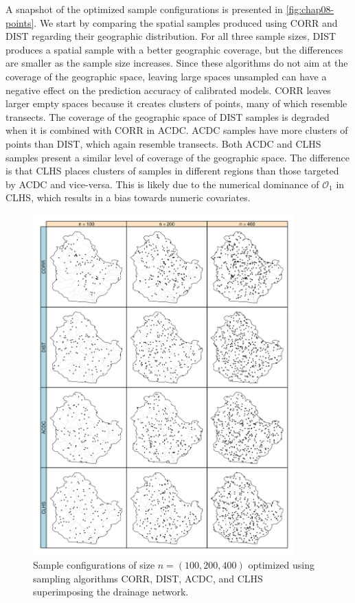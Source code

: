 A snapshot of the optimized sample configurations is presented in \autoref{fig:chap08-points}. We start by 
comparing the spatial samples produced using CORR and DIST regarding their geographic distribution. For all 
three sample sizes, DIST produces a spatial sample with a better geographic coverage, but the differences are 
smaller as the sample size increases. Since these algorithms do not aim at the coverage of the geographic 
space, leaving large spaces unsampled can have a negative effect on the prediction accuracy of calibrated 
models. CORR leaves larger empty spaces because it creates clusters of points, many of which resemble 
transects. The coverage of the geographic space of DIST samples is degraded when it is combined with CORR in 
ACDC. 
ACDC samples have more clusters of points than DIST, which again resemble transects. Both ACDC and CLHS samples 
present a similar level of coverage of the geographic space. The difference is that CLHS places clusters of 
samples in different regions than those targeted by ACDC and vice-versa. This is likely due to the numerical 
dominance of $\mathcal{O}_1$ in CLHS, which results in a bias towards numeric covariates.

\begin{figure}[!ht]
 \centering
 \includegraphics[width=0.90\textwidth]{fig/chap08-points-corr-dist-acdc-clhs}
 \caption[Sample configurations optimized using four sampling algorithms.]{Sample configurations of size 
 $n = (100, 200, 400)$ optimized using sampling algorithms CORR, DIST,  ACDC, and CLHS superimposing the
 drainage network.}
 \label{fig:chap08-points}
\end{figure}

